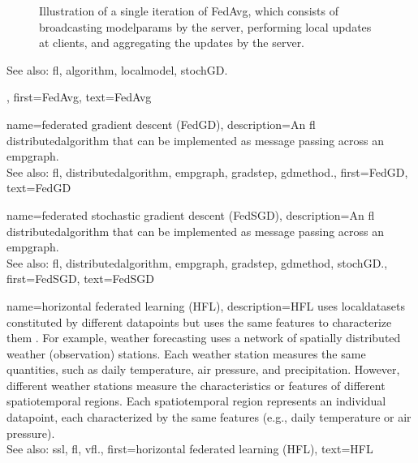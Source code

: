 {{\begin{figure}[H]
\begin{center}
			\end{center}
			\caption{Illustration of a single iteration of FedAvg, which consists of broadcasting \gls{modelparams} by the 
			server, performing local updates at clients, and aggregating the updates by the server. 
			\label{fig_single_iteration_fedavg_dict}} 
		\end{figure} 
		See also: \gls{fl}, \gls{algorithm}, \gls{localmodel}, \gls{stochGD}.},
	first={FedAvg},
	text={FedAvg}
} 

{name={federated gradient descent (FedGD)},
	description={An \gls{fl} \gls{distributedalgorithm} that 
		can be implemented as message passing across an \gls{empgraph}. 
		\\ 
		See also: \gls{fl}, \gls{distributedalgorithm}, \gls{empgraph}, \gls{gradstep}, \gls{gdmethod}.},
	first={FedGD},
	text={FedGD}
} 

{name={federated stochastic gradient descent (FedSGD)},
	description={An \gls{fl} \gls{distributedalgorithm} that 
		can be implemented as message passing across an \gls{empgraph}. 
		\\ 
		See also: \gls{fl}, \gls{distributedalgorithm}, \gls{empgraph}, \gls{gradstep}, \gls{gdmethod}, \gls{stochGD}.},
	first={FedSGD},
	text={FedSGD}
} 

{name={horizontal federated learning (HFL)},
	description={HFL uses \glspl{localdataset} constitut\-ed by different
	   	\glspl{datapoint} but uses the same \glspl{feature} to characterize them \cite{HFLChapter2020}.
		For example, weather forecasting uses a network of spatially distributed
		weather (observation) stations. Each weather station measures the
		same quantities, such as daily temperature, air pressure, and precipitation.
		However, different weather stations measure the characteristics or
		\glspl{feature} of different spatiotemporal regions. Each spatiotemporal region 
		represents an individual \gls{datapoint}, each characterized by the same \glspl{feature} 
		(e.g., daily temperature or air pressure).\\
		See also: \gls{ssl}, \gls{fl}, \gls{vfl}.},
	first={horizontal federated learning (HFL)},
	text={HFL}
} 

